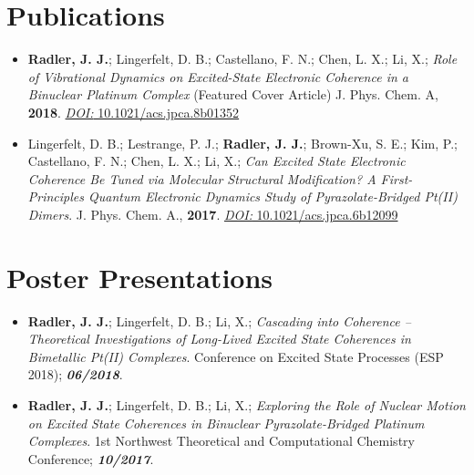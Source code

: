 \documentclass[letterpaper]{deedy-resume} %
\begin{document}
\begin{minipage}[t]{0.65\textwidth} %

\section{Publications}
\begin{itemize}
\item \textbf{Radler, J. J.}; Lingerfelt, D. B.; Castellano, F. N.; Chen, L. X.; Li, X.;	\textit{Role of Vibrational Dynamics on Excited-State Electronic Coherence in a Binuclear Platinum Complex} (Featured Cover Article) J. Phys. Chem. A, \textbf{2018}. \href{https://pubs.acs.org/doi/10.1021/acs.jpca.8b01352}{\textit{DOI:} 10.1021/acs.jpca.8b01352}

\item Lingerfelt, D. B.; Lestrange, P. J.; \textbf{Radler, J. J.}; Brown-Xu, S. E.; Kim, P.; Castellano, F. N.; Chen, L. X.; Li, X.;	\textit{Can Excited State Electronic Coherence Be Tuned via Molecular Structural Modification? A First-Principles Quantum Electronic Dynamics Study of Pyrazolate-Bridged Pt(II) Dimers}.
J. Phys. Chem. A., \textbf{2017}. \href{https://pubs.acs.org/doi/10.1021/acs.jpca.6b12099}{\textit{DOI:} 10.1021/acs.jpca.6b12099}
\end{itemize}

\section{Poster Presentations}
\begin{itemize}
\item \textbf{Radler, J. J.}; Lingerfelt, D. B.; Li, X.; \emph{Cascading into Coherence -- Theoretical Investigations of Long-Lived Excited State Coherences in Bimetallic Pt(II) Complexes}. Conference on Excited State Processes (ESP 2018);	\textbf{\textit{06/2018}}.

\item \textbf{Radler, J. J.}; Lingerfelt, D. B.; Li, X.; \emph{Exploring the Role of Nuclear Motion on Excited State Coherences in Binuclear Pyrazolate-Bridged Platinum Complexes}. 1st Northwest Theoretical and Computational Chemistry Conference;	\textbf{\textit{10/2017}}.


\end{itemize}
\end{minipage}
\end{document}
